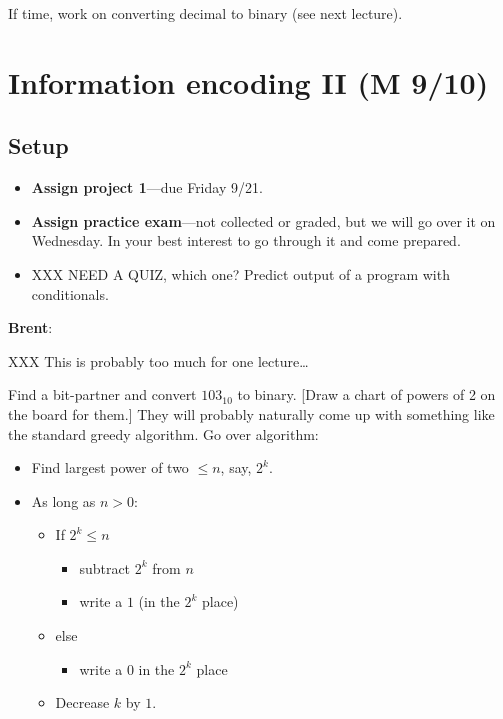 \documentclass{article}
\newenvironment{reflect}[1]
{
  \noindent
  \begin{lrbox}{\reflectbox}
    \begin{minipage}[t]{\textwidth}
      \textbf{#1}:
}{
    \end{minipage}
  \end{lrbox}
  \fbox{\usebox{\reflectbox}}
}
\begin{document}
If time, work on converting decimal to binary (see next lecture).

\newpage
\section{Information encoding II (M 9/10)}

\subsection*{Setup}
\begin{itemize}
\item \textbf{Assign project 1}---due Friday 9/21.
\item \textbf{Assign practice exam}---not collected or graded, but we
  will go over it on Wednesday.  In your best interest to go through
  it and come prepared.
\item XXX NEED A QUIZ, which one? Predict output of a program with
  conditionals.
\end{itemize}

\begin{reflect}{Brent}
  XXX This is probably too much for one lecture\dots
\end{reflect}

Find a bit-partner and convert $103_{10}$ to binary.  [Draw a chart of
powers of 2 on the board for them.]  They will probably naturally come
up with something like the standard greedy algorithm.  Go over algorithm:

\begin{itemize}
\item Find largest power of two $\leq n$, say, $2^k$.
\item As long as $n > 0$:
  \begin{itemize}
  \item If $2^k \leq n$
    \begin{itemize}
    \item subtract $2^k$ from $n$
    \item write a $1$ (in the $2^k$ place)
    \end{itemize}
  \item else
    \begin{itemize}
    \item  write a $0$ in the $2^k$ place
    \end{itemize}
  \item Decrease $k$ by $1$.
  \end{itemize}
\end{itemize}
\end{document}
